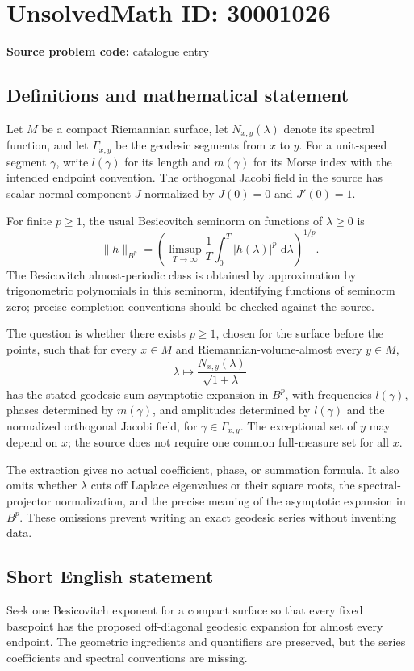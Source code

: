 \documentclass[11pt]{article}
\newcommand{\dd}{\,\mathrm{d}}
\begin{document}
\section*{UnsolvedMath ID: 30001026}
\textbf{Source problem code:} catalogue entry
\subsection{Definitions and mathematical statement}
Let \(M\) be a compact Riemannian surface, let \(N_{x,y}(\lambda)\) denote its spectral function, and let \(\Gamma_{x,y}\) be the geodesic segments from \(x\) to \(y\). For a unit-speed segment \(\gamma\), write \(l(\gamma)\) for its length and \(m(\gamma)\) for its Morse index with the intended endpoint convention. The orthogonal Jacobi field in the source has scalar normal component \(J\) normalized by \(J(0)=0\) and \(J'(0)=1\).

For finite \(p\geq1\), the usual Besicovitch seminorm on functions of \(\lambda\geq0\) is
\[
\|h\|_{B^p}=\left(\limsup_{T\to\infty}\frac1T\int_0^T|h(\lambda)|^p\,\dd\lambda\right)^{1/p}.
\]
The Besicovitch almost-periodic class is obtained by approximation by trigonometric polynomials in this seminorm, identifying functions of seminorm zero; precise completion conventions should be checked against the source.

The question is whether there exists \(p\geq1\), chosen for the surface before the points, such that for every \(x\in M\) and Riemannian-volume-almost every \(y\in M\),
\[
\lambda\longmapsto\frac{N_{x,y}(\lambda)}{\sqrt{1+\lambda}}
\]
has the stated geodesic-sum asymptotic expansion in \(B^p\), with frequencies \(l(\gamma)\), phases determined by \(m(\gamma)\), and amplitudes determined by \(l(\gamma)\) and the normalized orthogonal Jacobi field, for \(\gamma\in\Gamma_{x,y}\). The exceptional set of \(y\) may depend on \(x\); the source does not require one common full-measure set for all \(x\).

The extraction gives no actual coefficient, phase, or summation formula. It also omits whether \(\lambda\) cuts off Laplace eigenvalues or their square roots, the spectral-projector normalization, and the precise meaning of the asymptotic expansion in \(B^p\). These omissions prevent writing an exact geodesic series without inventing data.
\subsection{Short English statement}
Seek one Besicovitch exponent for a compact surface so that every fixed basepoint has the proposed off-diagonal geodesic expansion for almost every endpoint. The geometric ingredients and quantifiers are preserved, but the series coefficients and spectral conventions are missing.
\end{document}
